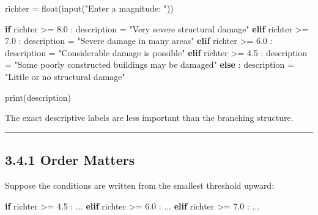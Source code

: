 \documentclass[
  11pt,
  a4paper,
]{article}
\newenvironment{Shaded}{}{}
\newcommand{\BuiltInTok}[1]{\textcolor[rgb]{0.00,0.50,0.00}{#1}}
\newcommand{\ControlFlowTok}[1]{\textcolor[rgb]{0.00,0.44,0.13}{\textbf{#1}}}
\newcommand{\FloatTok}[1]{\textcolor[rgb]{0.25,0.63,0.44}{#1}}
\newcommand{\NormalTok}[1]{#1}
\newcommand{\OperatorTok}[1]{\textcolor[rgb]{0.40,0.40,0.40}{#1}}
\newcommand{\StringTok}[1]{\textcolor[rgb]{0.25,0.44,0.63}{#1}}
\begin{document}
\begin{Shaded}
\begin{Highlighting}[]
\NormalTok{richter }\OperatorTok{=} \BuiltInTok{float}\NormalTok{(}\BuiltInTok{input}\NormalTok{(}\StringTok{"Enter a magnitude: "}\NormalTok{))}

\ControlFlowTok{if}\NormalTok{ richter }\OperatorTok{\textgreater{}=} \FloatTok{8.0}\NormalTok{ :}
\NormalTok{    description }\OperatorTok{=} \StringTok{"Very severe structural damage"}
\ControlFlowTok{elif}\NormalTok{ richter }\OperatorTok{\textgreater{}=} \FloatTok{7.0}\NormalTok{ :}
\NormalTok{    description }\OperatorTok{=} \StringTok{"Severe damage in many areas"}
\ControlFlowTok{elif}\NormalTok{ richter }\OperatorTok{\textgreater{}=} \FloatTok{6.0}\NormalTok{ :}
\NormalTok{    description }\OperatorTok{=} \StringTok{"Considerable damage is possible"}
\ControlFlowTok{elif}\NormalTok{ richter }\OperatorTok{\textgreater{}=} \FloatTok{4.5}\NormalTok{ :}
\NormalTok{    description }\OperatorTok{=} \StringTok{"Some poorly constructed buildings may be damaged"}
\ControlFlowTok{else}\NormalTok{ :}
\NormalTok{    description }\OperatorTok{=} \StringTok{"Little or no structural damage"}

\BuiltInTok{print}\NormalTok{(description)}
\end{Highlighting}
\end{Shaded}

The exact descriptive labels are less important than the branching
structure.

\begin{center}\rule{0.5\linewidth}{0.5pt}\end{center}

\subsection{3.4.1 Order Matters}\label{order-matters}

Suppose the conditions are written from the smallest threshold upward:

\begin{Shaded}
\begin{Highlighting}[]
\ControlFlowTok{if}\NormalTok{ richter }\OperatorTok{\textgreater{}=} \FloatTok{4.5}\NormalTok{ :}
\NormalTok{    ...}
\ControlFlowTok{elif}\NormalTok{ richter }\OperatorTok{\textgreater{}=} \FloatTok{6.0}\NormalTok{ :}
\NormalTok{    ...}
\ControlFlowTok{elif}\NormalTok{ richter }\OperatorTok{\textgreater{}=} \FloatTok{7.0}\NormalTok{ :}
\NormalTok{    ...}
\end{Highlighting}
\end{Shaded}
\end{document}
